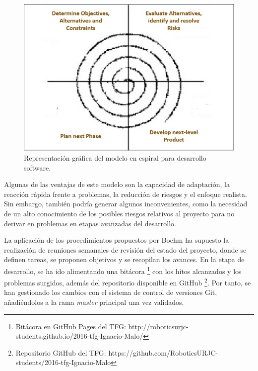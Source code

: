 \documentclass[12pt,spanish,chapterprefix, numbers=noenddot]{book}
\numberwithin{equation}{section}
\numberwithin{figure}{section}
\begin{document}
\begin{figure}[hbt!]
\centering
\includegraphics[width=12cm]{Figs/spiral_model.jpg}
\par
\caption{\label{fig:spiralModel}Representación gráfica del modelo en espiral para desarrollo software.}
\end{figure}

Algunas de las ventajas de este modelo son la capacidad de adaptación, la reacción rápida frente a problemas, la reducción de riesgos y el enfoque realista. Sin embargo, también podría generar algunos inconvenientes, como la necesidad de un alto conocimiento de los posibles riesgos relativos al proyecto para no derivar en problemas en etapas avanzadas del desarrollo. 

La aplicación de los procedimientos propuestos por Boehm ha supuesto la realización de reuniones semanales de revisión del estado del proyecto, donde se definen tareas, se proponen objetivos y se recopilan los avances. En la etapa de desarrollo, se ha ido alimentando una bitácora \footnote{Bitácora en GitHub Pages del TFG:  http://roboticsurjc-students.github.io/2016-tfg-Ignacio-Malo/} con los hitos alcanzados y los problemas surgidos, además del repositorio disponible en GitHub \footnote{Repositorio  GitHub del TFG: https://github.com/RoboticsURJC-students/2016-tfg-Ignacio-Malo}. Por tanto, se han gestionado los cambios con el sistema de control de versiones Git, añadiéndolos a la rama \textit{master} principal una vez validados.  
\end{document}
